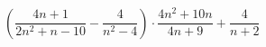 \begin{ex}[type=simplify_calculate]
	\begin{condition}
		\(\left( \dfrac{4n+1}{2n^2+n-10}-\dfrac{4}{n^2-4} \right)\cdot\dfrac{4n^2+10n}{4n+9}+\dfrac{4}{n+2}\)
	\end{condition}
\end{ex}